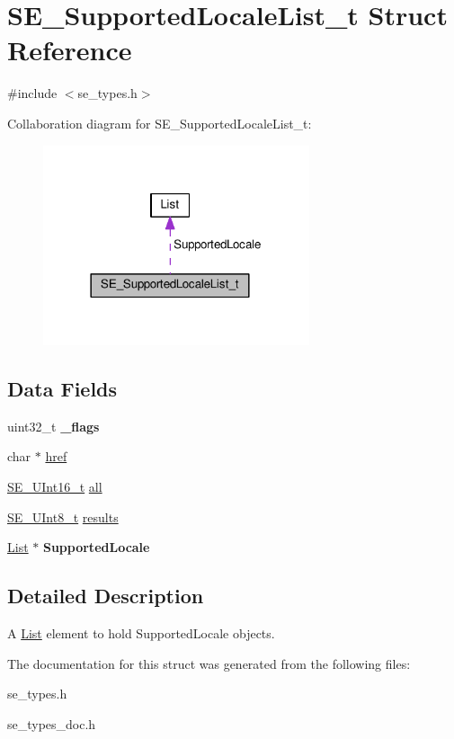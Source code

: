 \hypertarget{structSE__SupportedLocaleList__t}{}\section{S\+E\+\_\+\+Supported\+Locale\+List\+\_\+t Struct Reference}
\label{structSE__SupportedLocaleList__t}


{\ttfamily \#include $<$se\+\_\+types.\+h$>$}



Collaboration diagram for S\+E\+\_\+\+Supported\+Locale\+List\+\_\+t\+:\nopagebreak
\begin{figure}[H]
\begin{center}
\leavevmode
\includegraphics[width=222pt]{structSE__SupportedLocaleList__t__coll__graph}
\end{center}
\end{figure}
\subsection*{Data Fields}
\begin{DoxyCompactItemize}
\item 
uint32\+\_\+t {\bfseries \+\_\+flags}
\item 
char $\ast$ \hyperlink{group__SupportedLocaleList_ga71abc6b4fb4809aa25326cc667563089}{href}
\item 
\hyperlink{group__UInt16_gac68d541f189538bfd30cfaa712d20d29}{S\+E\+\_\+\+U\+Int16\+\_\+t} \hyperlink{group__SupportedLocaleList_ga6e78274b14e2975edfae1ea26dce27ba}{all}
\item 
\hyperlink{group__UInt8_gaf7c365a1acfe204e3a67c16ed44572f5}{S\+E\+\_\+\+U\+Int8\+\_\+t} \hyperlink{group__SupportedLocaleList_ga158a15d56c70b7f3485e85ee88e2c744}{results}
\item 
\hyperlink{structList}{List} $\ast$ {\bfseries Supported\+Locale}
\end{DoxyCompactItemize}


\subsection{Detailed Description}
A \hyperlink{structList}{List} element to hold Supported\+Locale objects. 

The documentation for this struct was generated from the following files\+:\begin{DoxyCompactItemize}
\item 
se\+\_\+types.\+h\item 
se\+\_\+types\+\_\+doc.\+h\end{DoxyCompactItemize}
